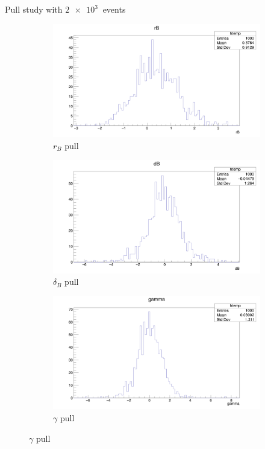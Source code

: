\documentclass{beamer}
\begin{document}
\begin{frame}{Pull study with $\SI{2e3}{}$ events}
  \begin{figure}
    \centering
    \vspace{-0.2cm}
    \begin{subfigure}{0.5\textwidth}
      \includegraphics[width = 1.0\textwidth]{SophisticatedPulls/rB1K1K.png}
      \caption{$r_B$ pull}
    \end{subfigure}%
    \begin{subfigure}{0.5\textwidth}
      \includegraphics[width = 1.0\textwidth]{SophisticatedPulls/dB1K1K.png}
      \caption{$\delta_B$ pull}
    \end{subfigure}
    \begin{subfigure}{0.5\textwidth}
      \includegraphics[width = 1.0\textwidth]{SophisticatedPulls/gamma1K1K.png}
      \caption{$\gamma$ pull}
    \end{subfigure}
  \end{figure}
\end{frame}
\end{document}
